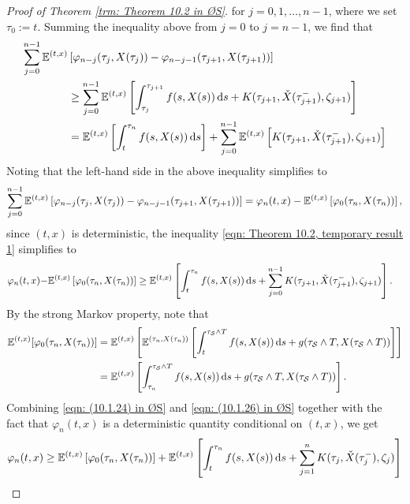 \begin{proof}[Proof of Theorem \ref{trm: Theorem 10.2 in ØS}]
    for $j=0,1,\ldots,n-1$, where we set $\tau_0:= t$. Summing the inequality above from $j=0$ to $j=n-1$, we find that
    \begin{align}
        \sum_{j=0}^{n-1} \mathbb{E}^{(t,x)} & \left[ \varphi_{n-j}(\tau_j, X(\tau_j)) - \varphi_{n-j-1}(\tau_{j+1}, X(\tau_{j+1}))\right] \nonumber \\
        & \geq \sum_{j=0}^{n-1} \mathbb{E}^{(t,x)} \left[ \int_{\tau_j}^{\tau_{j+1}} f(s,X(s)) \,\mathrm{d} s + K(\tau_{j+1},\check{X}(\tau_{j+1}^-), \zeta_{j+1}) \right] \nonumber \\
        &= \mathbb{E}^{(t,x)} \left[ \int_t^{\tau_n} f(s,X(s)) \,\mathrm{d} s \right] + \sum_{j=0}^{n-1} \mathbb{E}^{(t,x)} \left[ K(\tau_{j+1},\check{X}(\tau_{j+1}^-), \zeta_{j+1}) \right]
        \label{eqn: Theorem 10.2, temporary result 1}
    \end{align}
    Noting that the left-hand side in the above inequality simplifies to
    \begin{equation*}
        \sum_{j=0}^{n-1} \mathbb{E}^{(t,x)} \left[ \varphi_{n-j}(\tau_j, X(\tau_j)) - \varphi_{n-j-1}(\tau_{j+1}, X(\tau_{j+1}))\right] = \varphi_n(t,x) - \mathbb{E}^{(t,x)} \left[\varphi_0(\tau_n,X(\tau_n))\right],
    \end{equation*}
    since $(t,x)$ is deterministic, the inequality \eqref{eqn: Theorem 10.2, temporary result 1} simplifies to
    \begin{align}
        \varphi_n(t,x) - &\mathbb{E}^{(t,x)} \left[ \varphi_0(\tau_n, X(\tau_n)) \right] \geq \mathbb{E}^{(t,x)} \left[ \int_t^{\tau_n} f(s,X(s)) \,\mathrm{d} s + \sum_{j=0}^{n-1}K(\tau_{j+1},\check{X}(\tau_{j+1}^-), \zeta_{j+1}) \right].
        \label{eqn: (10.1.24) in ØS}
    \end{align}
    By the strong Markov property, note that
    \begin{align}
        \mathbb{E}^{(t,x)} [\varphi_0(\tau_n, X(\tau_n))] &= \mathbb{E}^{(t,x)} \left[ \mathbb{E}^{(\tau_n, X(\tau_n))}\left[ \int_t^{\tau_{\mathcal{S}} \wedge T} f(s,X(s)) \,\mathrm{d} s + g(\tau_{\mathcal{S}} \wedge T,X(\tau_{\mathcal{S}} \wedge T)) \right] \right] \nonumber \\
        &= \mathbb{E}^{(t,x)} \left[ \int_{\tau_n}^{\tau_{\mathcal{S}} \wedge T} f(s,X(s)) \,\mathrm{d} s + g(\tau_{\mathcal{S}} \wedge T,X(\tau_{\mathcal{S}} \wedge T)) \right].
        \label{eqn: (10.1.26) in ØS}
    \end{align}
    Combining \eqref{eqn: (10.1.24) in ØS} and \eqref{eqn: (10.1.26) in ØS} together with the fact that $\varphi_n(t,x)$ is a deterministic quantity conditional on $(t,x)$, we get
    \begin{align}
        \varphi_n(t,x) &\geq  \Etx\left[ \varphi_0(\tau_n, X(\tau_n)) \right] + \Etx\left[ \int_t^{\tau_n} f(s,X(s)) \diff s + \sum_{j=1}^n K(\tau_j,\check{X}(\tau_j^-),\zeta_j) \right] \nonumber \\

\end{align}
\end{proof}
